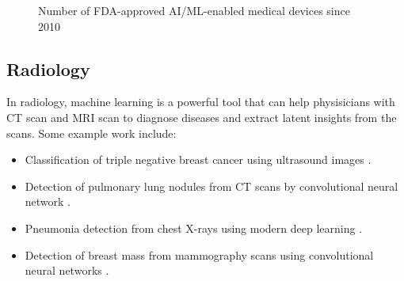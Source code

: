 \documentclass[a4paper]{article}
\begin{document}
\begin{figure}[htbp]
    \caption{Number of FDA-approved AI/ML-enabled medical devices since 2010} 
    \label{fig:FDA}
\end{figure}

\subsection{Radiology}
In radiology, machine learning is a powerful tool that can help physisicians with CT scan and MRI scan to diagnose diseases and extract latent insights from the scans. Some example work include:
\begin{itemize}
    \item Classification of triple negative breast cancer using ultrasound images \cite{wu_machine_2019}.
    \item Detection of pulmonary lung nodules from CT scans by convolutional neural network \cite{van_ginneken_off--shelf_2015}.
    \item Pneumonia detection from chest X-rays using modern deep learning \cite{rajpurkar_chexnet_2017}.
    \item Detection of breast mass from mammography scans using convolutional neural networks \cite{arevalo_convolutional_2015}.
\end{itemize} 
\end{document}

